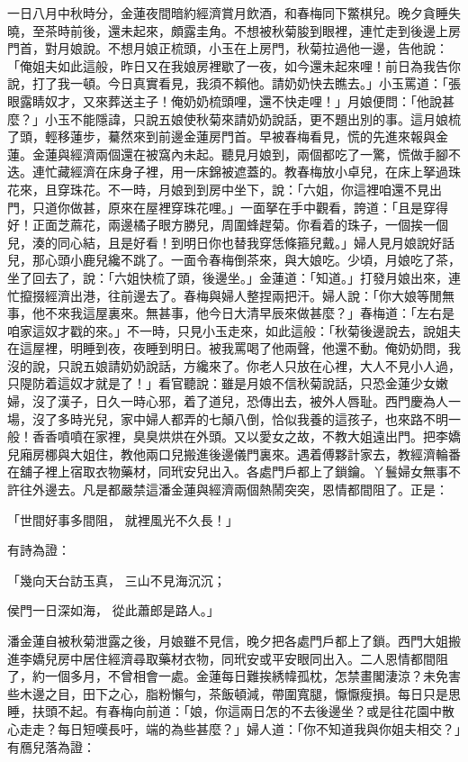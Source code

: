 一日八月中秋時分，金蓮夜間暗約經濟賞月飲酒，和春梅同下鱉棋兒。晚夕貪睡失曉，至茶時前後，還未起來，頗露圭角。不想被秋菊朘到眼裡，連忙走到後邊上房門首，對月娘說。不想月娘正梳頭，小玉在上房門，秋菊拉過他一邊，告他說：「俺姐夫如此這般，昨日又在我娘房裡歇了一夜，如今還未起來哩！前日為我告你說，打了我一頓。今日真實看見，我須不賴他。請奶奶快去瞧去。」小玉罵道：「張眼露睛奴才，又來葬送主子！俺奶奶梳頭哩，還不快走哩！」月娘便問：「他說甚麼？」小玉不能隱諱，只說五娘使秋菊來請奶奶說話，更不題出別的事。這月娘梳了頭，輕移蓮步，驀然來到前邊金蓮房門首。早被春梅看見，慌的先進來報與金蓮。金蓮與經濟兩個還在被窩內未起。聽見月娘到，兩個都吃了一驚，慌做手腳不迭。連忙藏經濟在床身子裡，用一床錦被遮蓋的。教春梅放小卓兒，在床上拏過珠花來，且穿珠花。不一時，月娘到到房中坐下，說：「六姐，你這裡咱還不見出門，只道你做甚，原來在屋裡穿珠花哩。」一面拏在手中觀看，誇道：「且是穿得好！正面芝蔴花，兩邊橘子眼方勝兒，周圍蜂趕菊。你看着的珠子，一個挨一個兒，湊的同心結，且是好看！到明日你也替我穿恁條箍兒戴。」婦人見月娘說好話兒，那心頭小鹿兒纔不跳了。一面令春梅倒茶來，與大娘吃。少頃，月娘吃了茶，坐了回去了，說：「六姐快梳了頭，後邊坐。」金蓮道：「知道。」打發月娘出來，連忙攛掇經濟出港，往前邊去了。春梅與婦人整捏兩把汗。婦人說：「你大娘等閒無事，他不來我這屋裏來。無甚事，他今日大清早辰來做甚麼？」春梅道：「左右是咱家這奴才戳的來。」不一時，只見小玉走來，如此這般：「秋菊後邊說去，說姐夫在這屋裡，明睡到夜，夜睡到明日。被我罵喝了他兩聲，他還不動。俺奶奶問，我沒的說，只說五娘請奶奶說話，方纔來了。你老人只放在心裡，大人不見小人過，只隄防着這奴才就是了！」看官聽說：雖是月娘不信秋菊說話，只恐金蓮少女嫩婦，沒了漢子，日久一時心邪，着了道兒，恐傳出去，被外人唇耻。西門慶為人一場，沒了多時光兒，家中婦人都弄的七顛八倒，恰似我養的這孩子，也來路不明一般！香香噴噴在家裡，臭臭烘烘在外頭。又以愛女之故，不教大姐遠出門。把李嬌兒廂房梛與大姐住，教他兩口兒搬進後邊儀門裏來。遇着傅夥計家去，教經濟輪番在舖子裡上宿取衣物藥材，同玳安兒出入。各處門戶都上了鎖鑰。丫鬟婦女無事不許往外邊去。凡是都嚴禁這潘金蓮與經濟兩個熱鬧突突，恩情都間阻了。正是：

「世間好事多間阻，  就裡風光不久長！」

有詩為證：

「幾向天台訪玉真，  三山不見海沉沉；

侯門一日深如海，  從此蕭郎是路人。」

潘金蓮自被秋菊泄露之後，月娘雖不見信，晚夕把各處門戶都上了鎖。西門大姐搬進李嬌兒房中居住經濟尋取藥材衣物，同玳安或平安眼同出入。二人恩情都間阻了，約一個多月，不曾相會一處。金蓮每日難挨綉幃孤枕，怎禁畫閣淒涼？未免害些木邊之目，田下之心，脂粉懶勻，茶飯頓減，帶圍寬腿，懨懨瘦損。每日只是思睡，扶頭不起。有春梅向前道：「娘，你這兩日怎的不去後邊坐？或是往花園中散心走走？每日短嘆長吁，端的為些甚麼？」婦人道：「你不知道我與你姐夫相交？」有鴈兒落為證：

